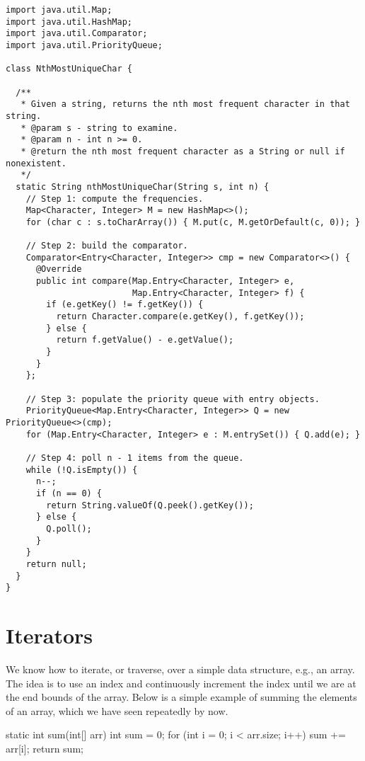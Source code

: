 \begin{cl}[]{}
\begin{lstlisting}[language=MyJava]
import java.util.Map;
import java.util.HashMap;
import java.util.Comparator;
import java.util.PriorityQueue;

class NthMostUniqueChar {

  /**
   * Given a string, returns the nth most frequent character in that string.
   * @param s - string to examine.
   * @param n - int n >= 0.
   * @return the nth most frequent character as a String or null if nonexistent.
   */
  static String nthMostUniqueChar(String s, int n) {
    // Step 1: compute the frequencies.
    Map<Character, Integer> M = new HashMap<>();
    for (char c : s.toCharArray()) { M.put(c, M.getOrDefault(c, 0)); }

    // Step 2: build the comparator.
    Comparator<Entry<Character, Integer>> cmp = new Comparator<>() {
      @Override
      public int compare(Map.Entry<Character, Integer> e, 
                         Map.Entry<Character, Integer> f) {
        if (e.getKey() != f.getKey()) {
          return Character.compare(e.getKey(), f.getKey());
        } else {
          return f.getValue() - e.getValue();
        }
      }
    };

    // Step 3: populate the priority queue with entry objects.
    PriorityQueue<Map.Entry<Character, Integer>> Q = new PriorityQueue<>(cmp);
    for (Map.Entry<Character, Integer> e : M.entrySet()) { Q.add(e); }

    // Step 4: poll n - 1 items from the queue.
    while (!Q.isEmpty()) {
      n--;
      if (n == 0) {
        return String.valueOf(Q.peek().getKey());
      } else {
        Q.poll();
      }
    }
    return null;
  }
}
\end{lstlisting}
\end{cl}

\section{Iterators}
We know how to iterate, or traverse, over a simple data structure, e.g., an array. The idea is to use an index and continuously increment the index until we are at the end bounds of the array. Below is a simple example of summing the elements of an array, which we have seen repeatedly by now.

\begin{verbnobox}[\small]
static int sum(int[] arr) {
  int sum = 0;
  for (int i = 0; i < arr.size; i++) { sum += arr[i]; }
  return sum;
}
\end{verbnobox}

